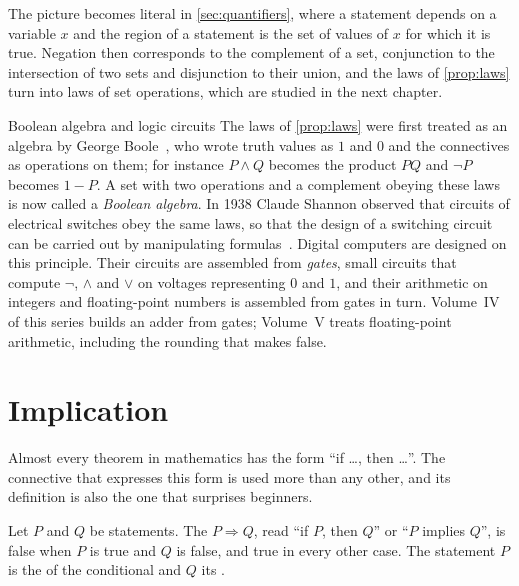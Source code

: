 The picture becomes literal in \cref{sec:quantifiers}, where a statement depends on a variable $x$ and the region of a statement is the set of values of $x$ for which it is true. Negation then corresponds to the complement of a set, conjunction to the intersection of two sets and disjunction to their union, and the laws of \cref{prop:laws} turn into laws of set operations, which are studied in the next chapter.

\begin{note}{Boolean algebra and logic circuits}
The laws of \cref{prop:laws} were first treated as an algebra by George Boole~\cite{boole1847,boole1854}, who wrote truth values as $1$ and $0$ and the connectives as operations on them; for instance $P\wedge Q$ becomes the product $PQ$ and $\neg P$ becomes $1-P$. A set with two operations and a complement obeying these laws is now called a \emph{Boolean algebra}. In 1938 Claude Shannon observed that circuits of electrical switches obey the same laws, so that the design of a switching circuit can be carried out by manipulating formulas~\cite{shannon1938}. Digital computers are designed on this principle. Their circuits are assembled from \emph{gates}, small circuits that compute $\neg$, $\wedge$ and $\vee$ on voltages representing $0$ and $1$, and their arithmetic on integers and floating-point numbers is assembled from gates in turn. Volume~IV of this series builds an adder from gates; Volume~V treats floating-point arithmetic, including the rounding that makes  false.
\end{note}

\section{Implication}
\label{sec:implication}

Almost every theorem in mathematics has the form ``if \ldots, then \ldots''. The connective that expresses this form is used more than any other, and its definition is also the one that surprises beginners.

\begin{definition}[Conditional]
\label{def:conditional}
Let $P$ and $Q$ be statements. The  $P\Rightarrow Q$, read ``if $P$, then $Q$'' or ``$P$ implies $Q$'', is false when $P$ is true and $Q$ is false, and true in every other case. The statement $P$ is the  of the conditional and $Q$ its .
\end{definition}

